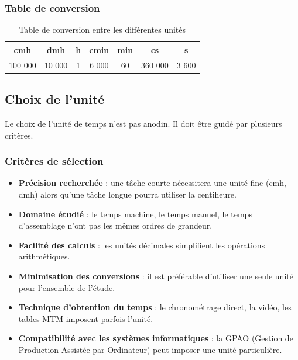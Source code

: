 \documentclass[a4paper,12pt]{article}
\begin{document}
\subsubsection{Table de conversion}

\begin{table}[ht]
\centering
\begin{tabular}{|c|c|c|c|c|c|c|}
\hline
\textbf{cmh} & \textbf{dmh} & \textbf{h} & \textbf{cmin} & \textbf{min} & \textbf{cs} & \textbf{s} \\
\hline
100 000 & 10 000 & 1 & 6 000 & 60 & 360 000 & 3 600 \\
\hline
\end{tabular}
\caption{Table de conversion entre les différentes unités}
\end{table}

\subsection{Choix de l'unité}

Le choix de l'unité de temps n'est pas anodin. Il doit être guidé par plusieurs critères.

\subsubsection{Critères de sélection}

\begin{itemize}
    \item \textbf{Précision recherchée} : une tâche courte nécessitera une unité fine (cmh, dmh) alors qu'une tâche longue pourra utiliser la centiheure.
    
    \item \textbf{Domaine étudié} : le temps machine, le temps manuel, le temps d'assemblage n'ont pas les mêmes ordres de grandeur.
    
    \item \textbf{Facilité des calculs} : les unités décimales simplifient les opérations arithmétiques.
    
    \item \textbf{Minimisation des conversions} : il est préférable d'utiliser une seule unité pour l'ensemble de l'étude.
    
    \item \textbf{Technique d'obtention du temps} : le chronométrage direct, la vidéo, les tables MTM imposent parfois l'unité.
    
    \item \textbf{Compatibilité avec les systèmes informatiques} : la GPAO (Gestion de Production Assistée par Ordinateur) peut imposer une unité particulière.
\end{itemize}
\end{document}
